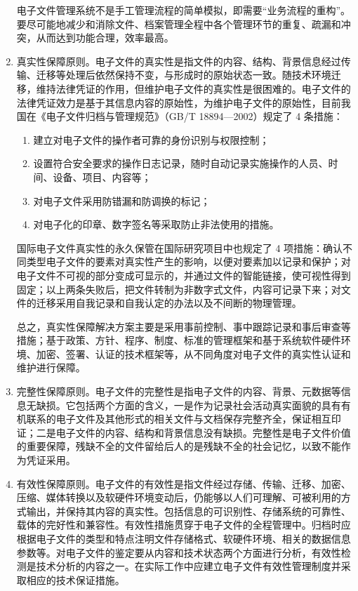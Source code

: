 \begin{enumerate}
        电子文件管理系统不是手工管理流程的简单模拟，即需要“业务流程的重构”。要尽可能地减少和消除文件、档案管理全程中各个管理环节的重复、疏漏和冲突，从而达到功能合理，效率最高。

        \item 真实性保障原则。电子文件的真实性是指文件的内容、结构、背景信息经过传输、迁移等处理后依然保持不变，与形成时的原始状态一致。随技术环境迁移，维持法律凭证的作用，但维护电子文件的真实性是很困难的。电子文件的法律凭证效力是基于其信息内容的原始性，为维护电子文件的原始性，目前我国在《电子文件归档与管理规范》（GB/T 18894—2002）规定了 4 条措施：
            \begin{enumerate}
                \item  建立对电子文件的操作者可靠的身份识别与权限控制；
                \item  设置符合安全要求的操作日志记录，随时自动记录实施操作的人员、时间、设备、项目、内容等；
                \item  对电子文件采用防错漏和防调换的标记；
                \item  对电子化的印章、数字签名等采取防止非法使用的措施。
            \end{enumerate}

        国际电子文件真实性的永久保管在国际研究项目中也规定了 4 项措施：确认不同类型电子文件的要素对真实性产生的影响，以便对要素加以记录和保护；对电子文件不可视的部分变成可显示的，并通过文件的智能链接，使可视性得到固定；以上两条失败后，把文件转制为非数字式文件，内容可记录下来；对文件的迁移采用自我记录和自我认定的办法以及不间断的物理管理。

        总之，真实性保障解决方案主要是采用事前控制、事中跟踪记录和事后审查等措施；基于政策、方针、程序、制度、标准的管理框架和基于系统软件硬件环境、加密、签署、认证的技术框架等，从不同角度对电子文件的真实性认证和维护进行保障。

        \item 完整性保障原则。电子文件的完整性是指电子文件的内容、背景、元数据等信息无缺损。它包括两个方面的含义，一是作为记录社会活动真实面貌的具有有机联系的电子文件及其他形式的相关文件与文档保存完整齐全，保证相互印证；二是电子文件的内容、结构和背景信息没有缺损。完整性是电子文件价值的重要保障，残缺不全的文件留给后人的是残缺不全的社会记忆，以致不能作为凭证采用。

        \item 有效性保障原则。电子文件的有效性是指文件经过存储、传输、迁移、加密、压缩、媒体转换以及软硬件环境变动后，仍能够以人们可理解、可被利用的方式输出，并保持其内容的真实性。包括信息的可识别性、存储系统的可靠性、载体的完好性和兼容性。有效性措施贯穿于电子文件的全程管理中。归档时应根据电子文件的类型和特点注明文件存储格式、软硬件环境、相关的数据信息参数等。对电子文件的鉴定要从内容和技术状态两个方面进行分析，有效性检测是技术分析的内容之一。在实际工作中应建立电子文件有效性管理制度并采取相应的技术保证措施。


\end{enumerate}
